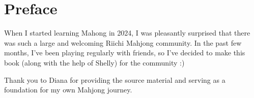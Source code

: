 \chapter{Preface}
\thispagestyle{empty}

When I started learning Mahong in 2024, I was pleasantly surprised that there was such a large and welcoming Riichi Mahjong community.
In the past few months, I've been playing regularly with friends, so I've decided to make this book (along with the help of Shelly) for the community :)

Thank you to Diana for providing the source material and serving as a foundation for my own Mahjong journey.

\vfill

